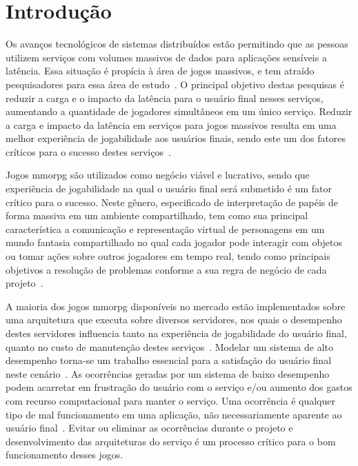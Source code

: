 \chapter{Introdução}
\label{introducao}



Os avanços tecnológicos de sistemas distribuídos estão permitindo que as pessoas utilizem serviços com volumes massivos de dados para aplicações sensíveis a latência.
%
Essa situação é propícia à área de jogos massivos, e tem atraído pesquisadores para essa área de estudo~\cite{mmo_analytic,1417630,6267019,6063041}.
%
O principal objetivo destas pesquisas é reduzir a carga e o impacto da latência para o usuário final nesses serviços, aumentando a quantidade de jogadores simultâneos em um único serviço.
%
Reduzir a carga e impacto da latência em serviços para jogos massivos resulta em uma melhor experiência de jogabilidade aos usuários finais, sendo este um dos fatores críticos para o sucesso destes serviços~\cite{1417630}.



Jogos \ac{mmorpg} são utilizados como negócio viável e lucrativo, sendo que experiência de jogabilidade na qual o usuário final será submetido é um fator crítico para o sucesso.
%
Neste gênero, especificado de interpretação de papéis de forma massiva em um ambiente compartilhado, tem como sua principal característica a comunicação e representação virtual de personagens em um mundo fantasia compartilhado no qual cada jogador pode interagir com objetos ou tomar ações sobre outros jogadores em tempo real, tendo como principais objetivos a resolução de problemas conforme a sua regra de negócio de cada projeto~\cite{video_game_technologies}.



A maioria dos jogos \ac{mmorpg} disponíveis no mercado estão implementados sobre uma arquitetura que executa sobre diversos servidores\cite{stephenclarkewillson2017}, nos quais o desempenho destes servidores influencia tanto na experiência de jogabilidade do usuário final, quanto no custo de manutenção destes serviços~\cite{1417630}.
%
Modelar um sistema de alto desempenho torna-se um trabalho essencial para a satisfação do usuário final neste cenário~\cite{1417630}.
%
As ocorrências geradas por um sistema de baixo desempenho podem acarretar em frustração do usuário com o serviço e/ou aumento dos gastos com recurso computacional para manter o serviço.
%
Uma ocorrência é qualquer tipo de mal funcionamento em uma aplicação, não necessariamente aparente ao usuário final~\cite{1417630}.
%
Evitar ou eliminar as ocorrências durante o projeto e desenvolvimento das arquiteturas do serviço é um processo crítico para o bom funcionamento desses jogos.



